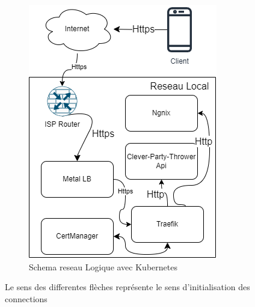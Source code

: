 \begin{figure}[H]
\begin{subfigure}[b]{0.45\textwidth}
        \includegraphics[width=\textwidth]{./images/shemaReseauKube.drawio}
        \caption{Schema reseau Logique avec Kubernetes}
        \label{fig:schemaKube}
    \end{subfigure}
    \caption{Le sens des differentes flèches représente le sens d'initialisation des connections}
    \label{fig:schemaReseau}
\end{figure}